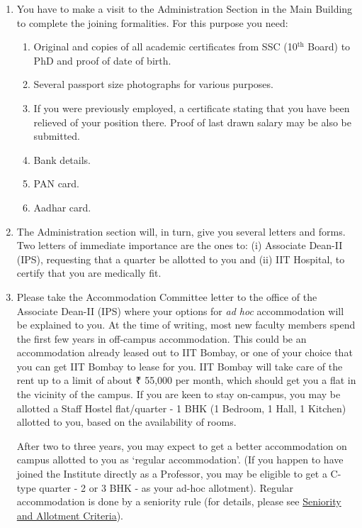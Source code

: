 \documentclass[
  10pt,
  a5paper,
  10pt,
  openany]{amsbook}
\providecommand{\tightlist}{%
  \setlength{\itemsep}{0pt}\setlength{\parskip}{0pt}}
\begin{document}
\begin{enumerate}
\def\labelenumi{\arabic{enumi}.}
\item
  You have to make a visit to the Administration Section in the Main
  Building to complete the joining formalities. For this purpose you
  need:

  \begin{enumerate}
  \def\labelenumii{\alph{enumii}.}
  \tightlist
  \item
    Original and copies of all academic certificates from SSC
    (10\(^{\text{th}}\) Board) to PhD and proof of date of birth.
  \item
    Several passport size photographs for various purposes.
  \item
    If you were previously employed, a certificate stating that you have
    been relieved of your position there. Proof of last drawn salary may
    be also be submitted.
  \item
    Bank details.
  \item
    PAN card.
  \item
    Aadhar card.
  \end{enumerate}
\item
  The Administration section will, in turn, give you several letters and
  forms. Two letters of immediate importance are the ones to: (i)
  Associate Dean-II (IPS), requesting that a quarter be allotted to you
  and (ii) IIT Hospital, to certify that you are medically fit.
\item
  Please take the Accommodation Committee letter to the office of the
  Associate Dean-II (IPS) where your options for \emph{ad hoc}
  accommodation will be explained to you. At the time of writing, most
  new faculty members spend the first few years in off-campus
  accommodation. This could be an accommodation already leased out to
  IIT Bombay, or one of your choice that you can get IIT Bombay to lease
  for you. IIT Bombay will take care of the rent up to a limit of about
  ₹ 55,000 per month, which should get you a flat in the vicinity of the
  campus. If you are keen to stay on-campus, you may be allotted a Staff
  Hostel flat/quarter - 1 BHK (1 Bedroom, 1 Hall, 1 Kitchen) allotted to
  you, based on the availability of rooms.

  After two to three years, you may expect to get a better accommodation
  on campus allotted to you as `regular accommodation'. (If you happen
  to have joined the Institute directly as a Professor, you may be
  eligible to get a C-type quarter - 2 or 3 BHK - as your ad-hoc
  allotment). Regular accommodation is done by a seniority rule (for
  details, please see
  \href{https://www.iitb.ac.in/deanpl/estOff1.html}{Seniority and
  Allotment Criteria}).


\end{enumerate}
\end{document}
